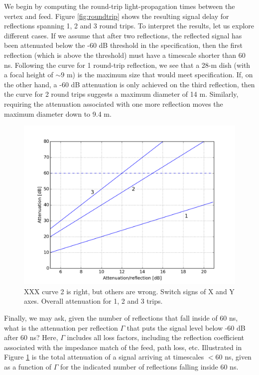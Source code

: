 \documentclass[11pt]{article}
\begin{document}
We begin by computing the round-trip light-propagation times between the vertex and feed.  Figure
\ref{fig:roundtrip} shows the resulting signal delay for reflections spanning 1, 2 and
3 round trips.  To interpret the results, let us explore different cases.
If we assume that after two reflections, the reflected signal has been attenuated
below the -60 dB threshold in the specification, then the first reflection (which is above the
threshold) must have a timescale shorter than 60 ns.  Following the curve for 1 round-trip
reflection, we see that a 28-m dish (with a focal height of $\sim9$ m) is the maximum size
that would meet specification.  If, on the other hand, a -60 dB attenuation is only achieved on the
third reflection, then the curve for 2 round trips suggests a maximum diameter of 14 m.  Similarly,
requiring the attenuation associated with one more reflection moves the maximum diameter down
to 9.4 m.

\begin{figure}[h]
\centering
\includegraphics[width=1.0\textwidth]{bounces.png}
\caption{XXX curve 2 is right, but others are wrong.  Switch signs of X and Y axes.
Overall attenuation for 1, 2 and 3 trips.
} \label{fig:bounces}
\end{figure}

Finally, we may ask, given the number of reflections that fall inside of 60 ns,
what is the attenuation per reflection $\Gamma$ that puts the signal level below
-60 dB after 60 ns?  Here, $\Gamma$ includes all loss factors, including the 
reflection coefficient associated with the impedance match of the feed,
path loss, etc.  Illustrated in Figure \ref{fig:bounces} is the total attenuation 
of a signal arriving at timescales $<$60 ns,
given as a function of $\Gamma$ for the indicated number of reflections falling
inside 60 ns.
\end{document}
